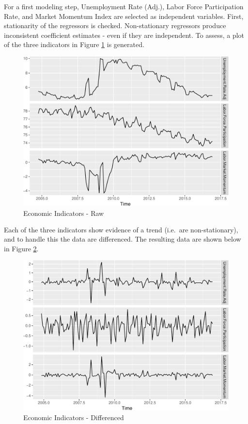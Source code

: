\documentclass[12pt,letterpaper,toc=flat,oneside]{report}
\theoremstyle{definition}
\theoremstyle{definition}
\theoremstyle{definition}
\theoremstyle{remark}
\begin{document}
For a first modeling step, Unemployment Rate (Adj.), Labor Force
Participation Rate, and Market Momentum Index are selected as
independent variables. First, stationarity of the regressors is checked.
Non-stationary regressors produce inconsistent coefficient estimates -
even if they are independent. To assess, a plot of the three indicators
in Figure \ref{fig:econ-vars-1} is generated.

\begin{figure}[H]

{\centering \includegraphics{elliott-econometric-personnel-retention-18_files/figure-latex/econ-vars-1-1} 

}

\caption{Economic Indicators - Raw}\label{fig:econ-vars-1}
\end{figure}

Each of the three indicators show evidence of a trend (i.e.~are
non-stationary), and to handle this the data are differenced. The
resulting data are shown below in Figure \ref{fig:econ-vars-2}.

\begin{figure}[H]

{\centering \includegraphics{elliott-econometric-personnel-retention-18_files/figure-latex/econ-vars-2-1} 

}

\caption{Economic Indicators - Differenced}\label{fig:econ-vars-2}
\end{figure}
\end{document}
